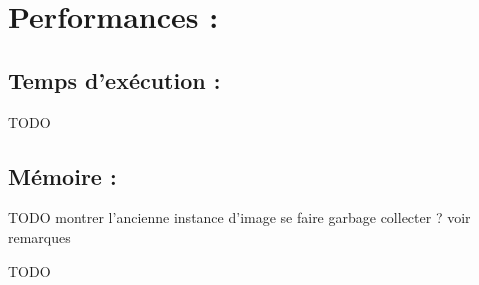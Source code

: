 \section{Performances :}

\subsection{Temps d'exécution :}
TODO


\subsection{Mémoire :}
TODO montrer l'ancienne instance d'image se faire garbage collecter ? voir remarques

TODO